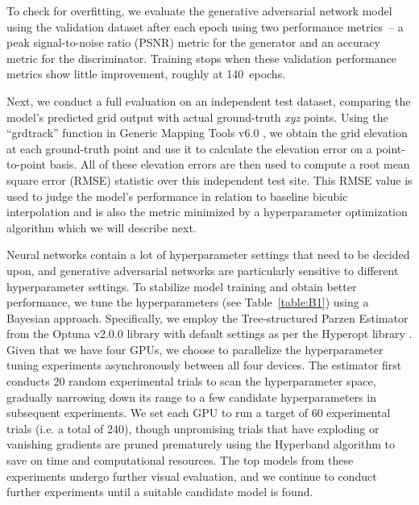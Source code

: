 To check for overfitting, we evaluate the generative adversarial network model using the validation dataset after each epoch using two performance metrics~-- a peak signal-to-noise ratio (PSNR) metric for the generator and an accuracy metric for the discriminator.
Training stops when these validation performance metrics show little improvement, roughly at 140~epochs.

Next, we conduct a full evaluation on an independent test dataset, comparing the model's predicted grid output with actual ground-truth \textit{xyz} points.
Using the ``grdtrack'' function in Generic Mapping Tools v6.0 \citep{WesselGenericMappingTools2019}, we obtain the grid elevation at each ground-truth point and use it to calculate the elevation error on a point-to-point basis.
All of these elevation errors are then used to compute a root mean square error (RMSE) statistic over this independent test site.
This RMSE value is used to judge the model's performance in relation to baseline bicubic interpolation and is also the metric minimized by a hyperparameter optimization algorithm which we will describe next.

Neural networks contain a lot of hyperparameter settings that need to be decided upon, and generative adversarial networks are particularly sensitive to different hyperparameter settings.
To stabilize model training and obtain better performance, we tune the hyperparameters (see Table~\ref{table:B1}) using a Bayesian approach.
Specifically, we employ the Tree-structured Parzen Estimator \citep{BergstraAlgorithmsHyperparameterOptimization2011} from the Optuna v2.0.0 \citep{AkibaOptunaNextgenerationHyperparameter2019} library with default settings as per the Hyperopt library \citep{BergstraHyperoptPythonlibrary2015}.
Given that we have four GPUs, we choose to parallelize the hyperparameter tuning experiments asynchronously between all four devices.
The estimator first conducts 20 random experimental trials to scan the hyperparameter space, gradually narrowing down its range to a few candidate hyperparameters in subsequent experiments.
We set each GPU to run a target of 60 experimental trials (i.e. a total of 240), though unpromising trials that have exploding or vanishing gradients are pruned prematurely using the Hyperband algorithm \citep{LiHyperbandNovelBanditBased2018} to save on time and computational resources.
The top models from these experiments undergo further visual evaluation, and we continue to conduct further experiments until a suitable candidate model is found.


